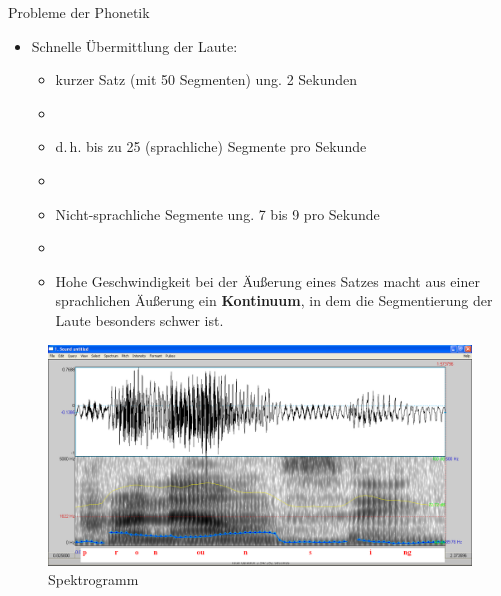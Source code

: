 \begin{frame}{Probleme der Phonetik}

	\begin{itemize}
		\item Schnelle Übermittlung der Laute:
		
		\begin{itemize}
			\item kurzer Satz (mit 50 Segmenten) \ras ung. 2 Sekunden
			\item[]
			\item d.\,h. bis zu 25 (sprachliche) Segmente pro Sekunde
			\item[]
			\item Nicht-sprachliche Segmente \ras ung. 7 bis 9 pro Sekunde
			\item[]
			\item[\ra] Hohe Geschwindigkeit bei der Äußerung eines Satzes macht aus einer sprachlichen Äußerung ein \textbf{Kontinuum}, in dem die Segmentierung der Laute besonders schwer ist.
		\end{itemize}
		
	\end{itemize}
	
\end{frame}



\begin{frame}

	\begin{figure}[H]
	\centering
	
	\includegraphics[scale=0.2]{material/04Pronouncing}
	\caption{Spektrogramm }
	\end{figure}	
	
\end{frame}


